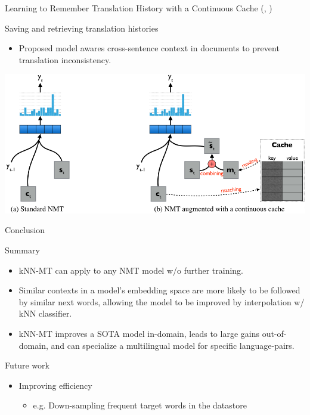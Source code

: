 \documentclass[unicode, 12pt, xdvipdfmx, aspectratio=169]{beamer}
\newcommand{\mycite}[1]{{\scriptsize\reffont({\citeauthor*{#1}, \citeyear{#1}})}}
\begin{document}
\begin{frame}[label={sec:org57beabb}]{\small Learning to Remember Translation History with a Continuous Cache \mycite{tu-etal-2018-learning}}
\begin{block}{Saving and retrieving translation histories}
\begin{itemize}
\item Proposed model awares cross-sentence context in documents to prevent translation inconsistency.
\end{itemize}

\begin{center}
\includegraphics[width=0.7\linewidth]{./figure/tu-etal-2018-learning/Figure2.pdf}
\end{center}
\end{block}
\end{frame}

\begin{frame}[label={sec:org9d97adc}]{Conclusion}
\begin{block}{Summary}
\begin{itemize}
\item kNN-MT can apply to any NMT model w/o further training.
\item Similar contexts in a model's embedding space are more likely to be followed by similar next words, allowing the model to be improved by interpolation w/ kNN classifier.
\item kNN-MT improves a SOTA model in-domain, leads to large gains out-of-domain, and can specialize a multilingual model for specific language-pairs.
\end{itemize}

\vspace{-0.3cm}
\end{block}
\begin{block}{Future work}
\begin{itemize}
\item Improving efficiency
\begin{itemize}
\item e.g. Down-sampling frequent target words in the datastore
\end{itemize}
\end{itemize}
\end{block}
\end{frame}
\end{document}
